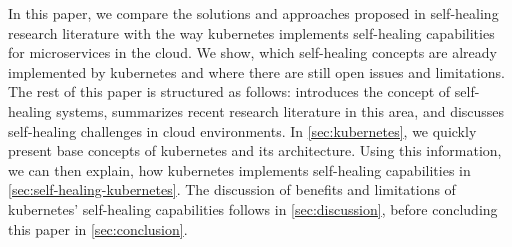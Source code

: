   In this paper, we compare the solutions and approaches proposed in self-healing research literature with the way \gls{kubernetes} implements self-healing capabilities for microservices in the cloud.
  We show, which self-healing concepts are already implemented by \gls{kubernetes} and where there are still open issues and limitations.
  The rest of this paper is structured as follows:
   introduces the concept of self-healing systems, summarizes recent research literature in this area, and discusses self-healing challenges in cloud environments.
  In \cref{sec:kubernetes}, we quickly present base concepts of \gls{kubernetes} and its architecture.
  Using this information, we can then explain, how \gls{kubernetes} implements self-healing capabilities in \cref{sec:self-healing-kubernetes}.
  The discussion of benefits and limitations of \gls{kubernetes}' self-healing capabilities follows in \cref{sec:discussion}, before concluding this paper in \cref{sec:conclusion}.
